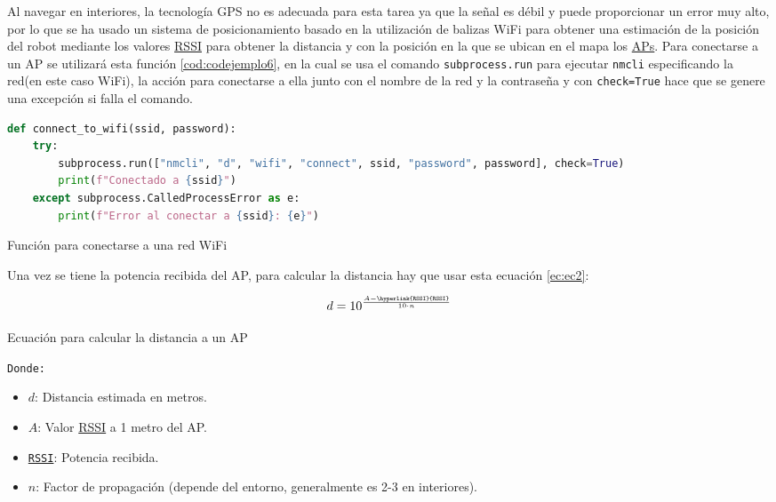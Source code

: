 Al navegar en interiores, la tecnología GPS no es adecuada para esta tarea ya que la señal es débil y puede proporcionar un error muy alto, por lo que se ha usado un sistema de posicionamiento basado en la utilización de balizas WiFi para obtener una estimación de la posición del robot mediante los valores \hyperlink{RSSI}{RSSI} para obtener la distancia y con la posición en la que se ubican en el mapa los \hyperlink{APs}{APs}. Para conectarse a un AP se utilizará esta función \ref{cod:codejemplo6}, en la cual se usa el comando \texttt{subprocess.run} para ejecutar \texttt{nmcli} especificando la red(en este caso WiFi), la acción para conectarse a ella junto con el nombre de la red y la contraseña y con \texttt{check=True} hace que se genere una excepción si falla el comando.\\

\begin{code}[H]
\begin{lstlisting}[language=Python]
def connect_to_wifi(ssid, password):
    try:
        subprocess.run(["nmcli", "d", "wifi", "connect", ssid, "password", password], check=True)
        print(f"Conectado a {ssid}")
    except subprocess.CalledProcessError as e:
        print(f"Error al conectar a {ssid}: {e}")
\end{lstlisting}
\caption[Función para conectarse a una red WiFi]{Función para conectarse a una red WiFi}
\label{cod:codejemplo6}
\end{code}

Una vez se tiene la potencia recibida del AP, para calcular la distancia hay que usar esta ecuación \ref{ec:ec2}:




\begin{myequation}[H]
\begin{equation}
d = 10^{\frac{A - \texttt{\hyperlink{RSSI}{RSSI}}}{10 \cdot n}}
\label{ec:ec2}
\end{equation}
\caption[Ecuación para calcular la distancia a un AP]{Ecuación para calcular la distancia a un AP}
\end{myequation} 
\texttt{Donde:}
\begin{itemize}
    \item $d$: Distancia estimada en metros.
    \item $A$: Valor \hyperlink{RSSI}{RSSI} a 1 metro del AP.
    \item \texttt{\hyperlink{RSSI}{RSSI}}: Potencia recibida.
    \item $n$: Factor de propagación (depende del entorno, generalmente es 2-3 en interiores).
\end{itemize}


